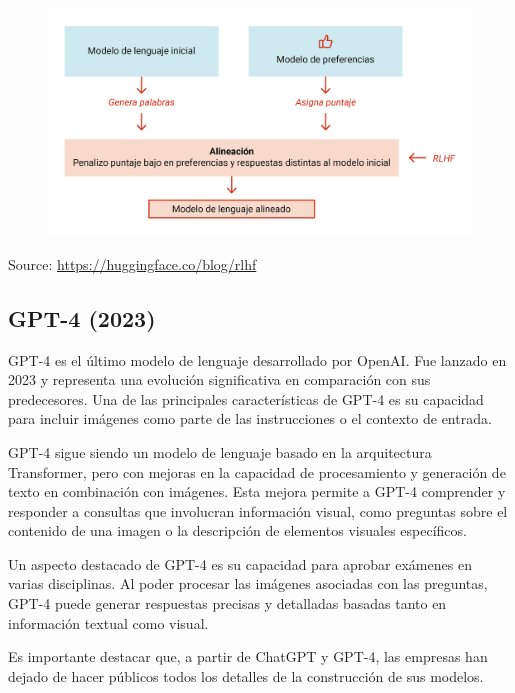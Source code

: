  \begin{figure}[h]
        	\includegraphics[scale = 0.5]{pics/RLHF.png}
        \end{figure}
        Source: \url{https://huggingface.co/blog/rlhf}



\subsection{GPT-4 (2023)}
GPT-4 \cite{openai2023gpt4} es el último modelo de lenguaje desarrollado por OpenAI. Fue lanzado en 2023 y representa una evolución significativa en comparación con sus predecesores. Una de las principales características de GPT-4 es su capacidad para incluir imágenes como parte de las instrucciones o el contexto de entrada.

GPT-4 sigue siendo un modelo de lenguaje basado en la arquitectura Transformer, pero con mejoras en la capacidad de procesamiento y generación de texto en combinación con imágenes. Esta mejora permite a GPT-4 comprender y responder a consultas que involucran información visual, como preguntas sobre el contenido de una imagen o la descripción de elementos visuales específicos.

Un aspecto destacado de GPT-4 es su capacidad para aprobar exámenes en varias disciplinas. Al poder procesar las imágenes asociadas con las preguntas, GPT-4 puede generar respuestas precisas y detalladas basadas tanto en información textual como visual.

Es importante destacar que, a partir de ChatGPT y GPT-4, las empresas han dejado de hacer públicos todos los detalles de la construcción de sus modelos.

